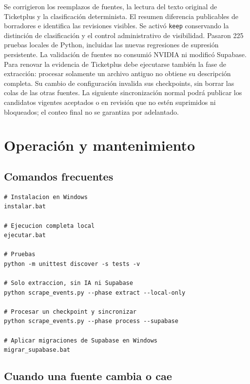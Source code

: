 \documentclass[11pt,a4paper]{article}
\begin{document}
Se corrigieron los reemplazos de fuentes, la lectura del texto original de Ticketplus y la clasificaci\'{o}n determinista. El resumen diferencia publicables de borradores e identifica las revisiones visibles. Se activ\'{o} \texttt{keep} conservando la distinci\'{o}n de clasificaci\'{o}n y el control administrativo de visibilidad. Pasaron 225 pruebas locales de Python, incluidas las nuevas regresiones de supresi\'{o}n persistente. La validaci\'{o}n de fuentes no consumi\'{o} NVIDIA ni modific\'{o} Supabase. Para renovar la evidencia de Ticketplus debe ejecutarse tambi\'{e}n la fase de extracci\'{o}n: procesar solamente un archivo antiguo no obtiene su descripci\'{o}n completa. Su cambio de configuraci\'{o}n invalida sus checkpoints, sin borrar las colas de las otras fuentes. La siguiente sincronizaci\'{o}n normal podr\'{a} publicar los candidatos vigentes aceptados o en revisi\'{o}n que no est\'{e}n suprimidos ni bloqueados; el conteo final no se garantiza por adelantado.

\section{Operaci\'{o}n y mantenimiento}

\subsection{Comandos frecuentes}

\begin{lstlisting}
# Instalacion en Windows
instalar.bat

# Ejecucion completa local
ejecutar.bat

# Pruebas
python -m unittest discover -s tests -v

# Solo extraccion, sin IA ni Supabase
python scrape_events.py --phase extract --local-only

# Procesar un checkpoint y sincronizar
python scrape_events.py --phase process --supabase

# Aplicar migraciones de Supabase en Windows
migrar_supabase.bat
\end{lstlisting}

\subsection{Cuando una fuente cambia o cae}
\end{document}
